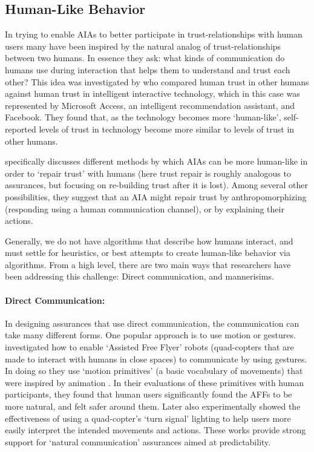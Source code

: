 \subsection{Human-Like Behavior} \label{sec:human_behavior}
In trying to enable AIAs to better participate in trust-relationships with human users many have been inspired by the natural analog of trust-relationships between two humans. In essence they ask: what kinds of communication do humans use during interaction that helps them to understand and trust each other? This idea was investigated by \cite{Tripp2011-rx} who compared human trust in other humans against human trust in intelligent interactive technology, which in this case was represented by Microsoft Access, an intelligent recommendation assistant, and Facebook. They found that, as the technology becomes more `human-like', self-reported levels of trust in technology become more similar to levels of trust in other humans. 

\citet{De_Visser2018-kd} specifically discusses different methods by which AIAs can be more human-like in order to `repair trust' with humans (here trust repair is roughly analogous to assurances, but focusing on re-building trust after it is lost). Among several other possibilities, they suggest that an AIA might repair trust by anthropomorphizing (responding using a human communication channel), or by explaining their actions. 

Generally, we do not have algorithms that describe how humans interact, and must settle for heuristics, or best attempts to create human-like behavior via algorithms. From a high level, there are two main ways that researchers have been addressing this challenge: Direct communication, and mannerisims.

\paragraph{Direct Communication:}
In designing assurances that use direct communication, the communication can take many different forms. One popular approach is to use motion or gestures.\citet{Szafir2014-ok} investigated how to enable `Assisted Free Flyer' robots (quad-copters that are made to interact with humans in close spaces) to communicate by using gestures. In doing so they use `motion primitives' (a basic vocabulary of movements) that were inspired by animation \cite{Van_Breemen2004-rz}. In their evaluations of these primitives with human participants, they found that human users significantly found the AFFs to be more natural, and felt safer around them. Later \citet{Szafir2015-iy} also experimentally showed the effectiveness of using a quad-copter's `turn signal' lighting to help users more easily interpret the intended movements and actions. These works provide strong support for `natural communication' assurances aimed at predictability.

